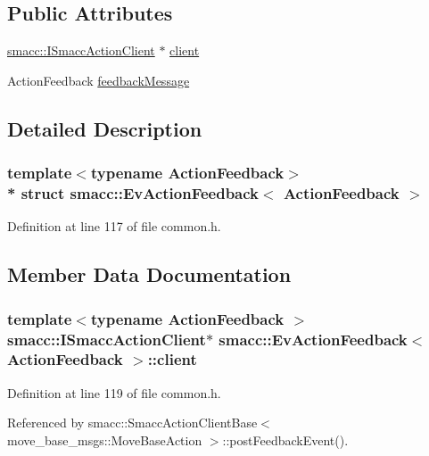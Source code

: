 \subsection*{Public Attributes}
\begin{DoxyCompactItemize}
\item 
\hyperlink{classsmacc_1_1ISmaccActionClient}{smacc\+::\+I\+Smacc\+Action\+Client} $\ast$ \hyperlink{structsmacc_1_1EvActionFeedback_a79bd45568b39330df89f45d138ace141}{client}
\item 
Action\+Feedback \hyperlink{structsmacc_1_1EvActionFeedback_a9e15b2862ee4e7c2e12407cfb3caa800}{feedback\+Message}
\end{DoxyCompactItemize}


\subsection{Detailed Description}
\subsubsection*{template$<$typename Action\+Feedback$>$\\*
struct smacc\+::\+Ev\+Action\+Feedback$<$ Action\+Feedback $>$}



Definition at line 117 of file common.\+h.



\subsection{Member Data Documentation}
\subsubsection[{\texorpdfstring{client}{client}}]{\setlength{\rightskip}{0pt plus 5cm}template$<$typename Action\+Feedback $>$ {\bf smacc\+::\+I\+Smacc\+Action\+Client}$\ast$ {\bf smacc\+::\+Ev\+Action\+Feedback}$<$ Action\+Feedback $>$\+::client}\hypertarget{structsmacc_1_1EvActionFeedback_a79bd45568b39330df89f45d138ace141}{}\label{structsmacc_1_1EvActionFeedback_a79bd45568b39330df89f45d138ace141}


Definition at line 119 of file common.\+h.



Referenced by smacc\+::\+Smacc\+Action\+Client\+Base$<$ move\+\_\+base\+\_\+msgs\+::\+Move\+Base\+Action $>$\+::post\+Feedback\+Event().

